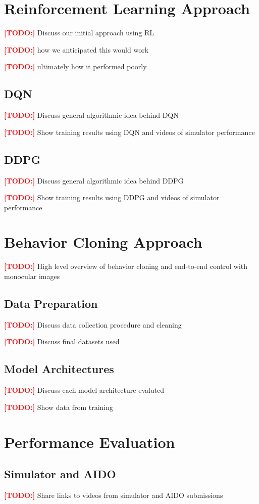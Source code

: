 \documentclass{article}
\newcommand\todo{\textcolor{red}{\textbf{[TODO:] }}}
\begin{document}
\section{Reinforcement Learning Approach}
\todo Discuss our initial approach using RL

\todo how we anticipated this would work

\todo ultimately how it performed poorly

\subsection{DQN}
\todo Discuss general algorithmic idea behind DQN

\todo Show training results using DQN and videos of simulator performance

\subsection{DDPG}
\todo Discuss general algorithmic idea behind DDPG

\todo Show training results using DDPG and videos of simulator performance

\section{Behavior Cloning Approach}
\todo High level overview of behavior cloning and end-to-end control with monocular images

\subsection{Data Preparation}
\todo Discuss data collection procedure and cleaning

\todo Discuss final datasets used

\subsection{Model Architectures}
\todo Discuss each model architecture evaluted

\todo Show data from training

\section{Performance Evaluation}
\subsection{Simulator and AIDO}
\todo Share links to videos from simulator and AIDO submissions
\end{document}
